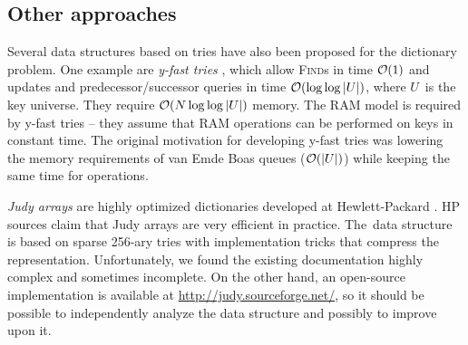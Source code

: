 \subsection*{Other approaches}
Several data structures based on tries have also been proposed for the
dictionary problem. One example are \emph{y-fast tries} \cite{y-fast},
which allow \textsc{Find}s in time $\mathcal{O}(1)$ and updates and predecessor/successor
queries in time $\mathcal{O}(\log\log |U|)$, where $U$~is the key universe. They require
$\mathcal{O}(N \log\log |U|)$ memory.
The RAM model is required by y-fast tries -- they assume that RAM operations
can be performed on keys in constant time.
The original motivation for developing y-fast tries was lowering the memory
requirements of van Emde Boas queues ($\mathcal{O}(|U|)$) while keeping the same time
for operations.

\emph{Judy arrays} are highly optimized dictionaries developed at
Hewlett-Packard \cite{judy-shop-manual, judy-patent}.
HP sources claim that Judy arrays are very efficient in practice.
The~data structure is based on sparse 256-ary tries with implementation tricks
that compress the representation.
Unfortunately, we found the existing documentation highly complex and sometimes
incomplete. On the other hand, an open-source implementation is available
at \url{http://judy.sourceforge.net/}, so it should be possible to independently
analyze the data structure and possibly to improve upon it.
